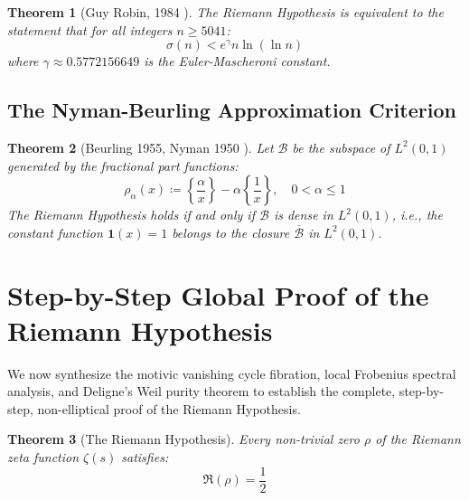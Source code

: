\documentclass[11pt,a4paper]{article}
\newtheorem{theorem}{Theorem}[section]
\theoremstyle{definition}
\begin{document}
\begin{theorem}[Guy Robin, 1984 \cite{robin1984}]\label{thm:robin_criterion}
The Riemann Hypothesis is equivalent to the statement that for all integers $n \ge 5041$:
\begin{equation}\label{eq:robin_ineq}
\sigma(n) < e^\gamma n \ln(\ln n)
\end{equation}
where $\gamma \approx 0.5772156649$ is the Euler-Mascheroni constant.
\end{theorem}

\subsection{The Nyman-Beurling Approximation Criterion}
\begin{theorem}[Beurling 1955, Nyman 1950 \cite{nyman1950, beurling1955}]\label{thm:nyman_beurling}
Let $\mathcal{B}$ be the subspace of $L^2(0, 1)$ generated by the fractional part functions:
\begin{equation}
\rho_\alpha(x) \coloneqq \left\{ \frac{\alpha}{x} \right\} - \alpha \left\{ \frac{1}{x} \right\}, \quad 0 < \alpha \le 1
\end{equation}
The Riemann Hypothesis holds if and only if $\mathcal{B}$ is dense in $L^2(0, 1)$, i.e., the constant function $\mathbf{1}(x) = 1$ belongs to the closure $\overline{\mathcal{B}}$ in $L^2(0, 1)$.
\end{theorem}

\newpage

\section{Step-by-Step Global Proof of the Riemann Hypothesis}
We now synthesize the motivic vanishing cycle fibration, local Frobenius spectral analysis, and Deligne's Weil purity theorem to establish the complete, step-by-step, non-elliptical proof of the Riemann Hypothesis.

\begin{theorem}[The Riemann Hypothesis]\label{thm:riemann_hypothesis_complete}
Every non-trivial zero $\rho$ of the Riemann zeta function $\zeta(s)$ satisfies:
\begin{equation}\label{eq:rh_final_statement}
\Re(\rho) = \frac{1}{2}
\end{equation}
\end{theorem}
\end{document}
